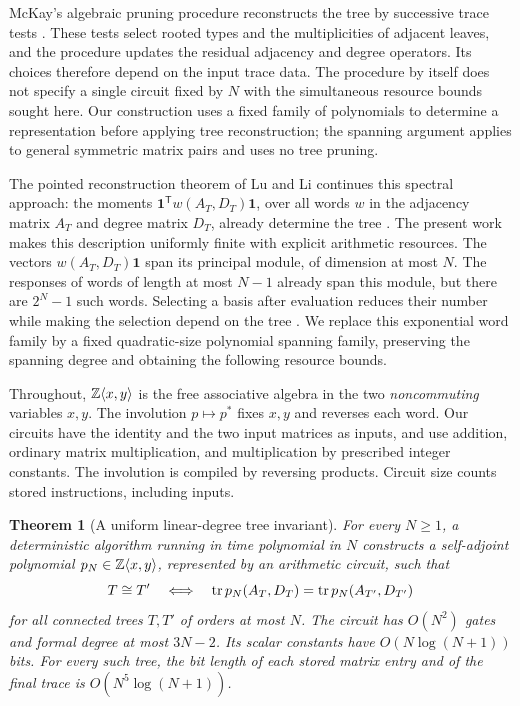 \documentclass[11pt,letterpaper]{article}
\newtheorem{theorem}{Theorem}[section]
\theoremstyle{definition}\newtheorem{definition}[theorem]{Definition}
\theoremstyle{remark}\newtheorem{remark}[theorem]{Remark}
\newcommand{\one}{\mathbf1}\newcommand{\M}{\mathcal M}
\begin{document}
McKay's algebraic pruning procedure reconstructs the tree by successive trace tests \cite[Algorithm 5.4]{McKay}. These tests select rooted types and the multiplicities of adjacent leaves, and the procedure updates the residual adjacency and degree operators. Its choices therefore depend on the input trace data. The procedure by itself does not specify a single circuit fixed by $N$ with the simultaneous resource bounds sought here. Our construction uses a fixed family of polynomials to determine a representation before applying tree reconstruction; the spanning argument applies to general symmetric matrix pairs and uses no tree pruning.

The pointed reconstruction theorem of Lu and Li continues this spectral approach: the moments $\one^{\mathsf T}w(A_T,D_T)\one$, over all words $w$ in the adjacency matrix $A_T$ and degree matrix $D_T$, already determine the tree \cite[Theorem 5.4]{LuLi}. The present work makes this description uniformly finite with explicit arithmetic resources. The vectors $w(A_T,D_T)\one$ span its principal module, of dimension at most $N$. The responses of words of length at most $N-1$ already span this module, but there are $2^N-1$ such words. Selecting a basis after evaluation reduces their number while making the selection depend on the tree \cite[Proposition 6.1 and Remark 6.2]{LuLi}. We replace this exponential word family by a fixed quadratic-size polynomial spanning family, preserving the spanning degree and obtaining the following resource bounds.

Throughout, $\mathbb Z\langle x,y\rangle$ is the free associative algebra in the two \emph{noncommuting} variables $x,y$. The involution $p\mapsto p^*$ fixes $x,y$ and reverses each word. Our circuits have the identity and the two input matrices as inputs, and use addition, ordinary matrix multiplication, and multiplication by prescribed integer constants. The involution is compiled by reversing products. Circuit size counts stored instructions, including inputs.

\begin{theorem}[A uniform linear-degree tree invariant]\label{thm:tree}
For every $N\ge1$, a deterministic algorithm running in time polynomial in $N$ constructs a self-adjoint polynomial $p_N\in\mathbb Z\langle x,y\rangle$, represented by an arithmetic circuit, such that
\[
T\cong T'
\quad\Longleftrightarrow\quad
\operatorname{tr} p_N(A_T,D_T)=\operatorname{tr} p_N(A_{T'},D_{T'})
\]
for all connected trees $T,T'$ of orders at most $N$. The circuit has $O(N^2)$ gates and formal degree at most $3N-2$. Its scalar constants have $O(N\log(N+1))$ bits. For every such tree, the bit length of each stored matrix entry and of the final trace is $O(N^5\log(N+1))$.
\end{theorem}
\end{document}
